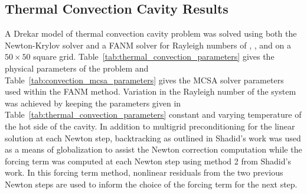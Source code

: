 \subsection{Thermal Convection Cavity Results}
\label{subsec:thermal_convection_verification}

A Drekar model of thermal convection cavity problem was solved using
both the Newton-Krylov solver and a FANM solver for Rayleigh numbers
of , ,  and  on a $50 \times 50$
square grid. Table~\ref{tab:thermal_convection_parameters} gives the
physical parameters of the problem and
Table~\ref{tab:convection_mcsa_parameters} gives the MCSA solver
parameters used within the FANM method. Variation in the Rayleigh
number of the system was achieved by keeping the parameters given in
Table~\ref{tab:thermal_convection_parameters} constant and varying
temperature of the hot side of the cavity. In addition to multigrid
preconditioning for the linear solution at each Newton step,
backtracking as outlined in Shadid's work \citep{shadid_inexact_1997}
was used as a means of globalization to assist the Newton correction
computation while the forcing term was computed at each Newton step
using method 2 from Shadid's work. In this forcing term method,
nonlinear residuals from the two previous Newton steps are used to
inform the choice of the forcing term for the next step.

